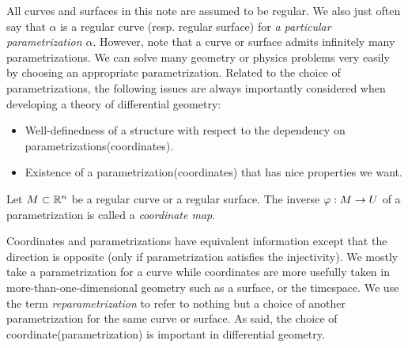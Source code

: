 \documentclass{../exp}
\def\a{\alpha}
\begin{document}
All curves and surfaces in this note are assumed to be regular.
We also just often say that $\a$ is a regular curve (resp. regular surface) for \emph{a particular parametrization $\a$}.
However, note that a curve or surface admits infinitely many parametrizations.
We can solve many geometry or physics problems very easily by choosing an appropriate parametrization.
Related to the choice of parametrizations, the following issues are always importantly considered when developing a theory of differential geometry:
\begin{itemize}
\item Well-definedness of a structure with respect to the dependency on parametrizations(coordinates).
\item Existence of a parametrization(coordinates) that has nice properties we want.
\end{itemize}

\begin{defn}
Let $M\subset\mathbb{R}^n$ be a regular curve or a regular surface.
The inverse $\f:M\to U$ of a parametrization is called a \emph{coordinate map}.
\end{defn}

Coordinates and parametrizations have equivalent information except that the direction is opposite (only if parametrization satisfies the injectivity).
We mostly take a parametrization for a curve while coordinates are more usefully taken in more-than-one-dimensional geometry such as a surface, or the timespace.
We use the term \emph{reparametrization} to refer to nothing but a choice of another parametrization for the same curve or surface.
As said, the choice of coordinate(parametrization) is important in differential geometry.
\end{document}
